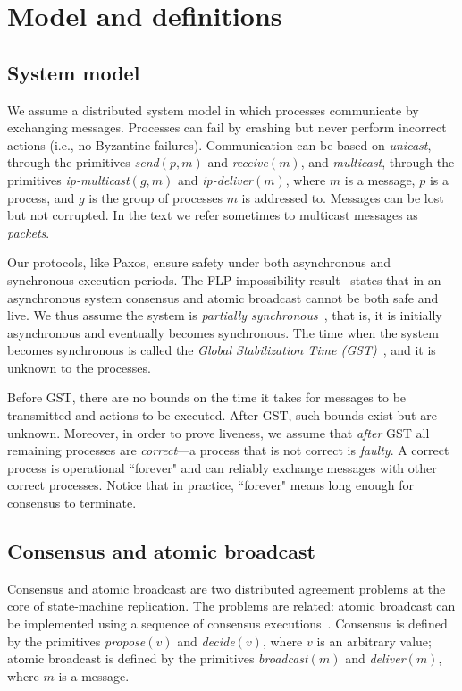\documentclass[final,3p,times,twocolumn,authoryear]{elsarticle}
\begin{document}
\section{Model and definitions}
\label{sec:moddef}

\subsection{System model}
\label{sec:model}

We assume a distributed system model in which processes communicate by exchanging messages. Processes can fail by crashing but never perform incorrect actions (i.e., no Byzantine failures).
Communication can be based on \emph{unicast}, through the primitives \emph{send}$(p,m)$ and \emph{receive}$(m)$, and \emph{multicast}, through the primitives \emph{ip-multicast}$(g,m)$ and \emph{ip-deliver}$(m)$, where $m$ is a message, $p$ is a process, and $g$ is the group of processes $m$ is addressed to. Messages can be lost but not corrupted. In the text we refer sometimes to multicast messages as \emph{packets}.

Our protocols, like Paxos, ensure safety under both asynchronous and synchronous execution periods. The FLP impossibility result~\cite{FLP85} states that in an asynchronous system consensus and atomic broadcast cannot be both safe and live. We thus assume the system is \emph{partially synchronous}~\cite{DLS88}, that is, it is initially asynchronous and eventually becomes synchronous. The time when the system becomes synchronous is called the \emph{Global Stabilization Time (GST)}~\cite{DLS88}, and it is unknown to the processes.

Before GST, there are no bounds on the time it takes for messages to be transmitted and actions to be executed. After GST, such bounds exist but are unknown. Moreover, in order to prove liveness, we assume that \emph{after} GST all remaining processes are \emph{correct}---a process that is not correct is \emph{faulty}. A correct process is operational ``forever" and can reliably exchange messages with other correct processes. Notice that in practice, ``forever" means long enough for consensus to terminate.


\subsection{Consensus and atomic broadcast}

Consensus and atomic broadcast are two distributed agreement problems at the core of state-machine replication. The problems are related: atomic broadcast can be implemented using a sequence of consensus executions~\cite{CT96}. Consensus is defined by the primitives \emph{propose}$(v)$ and \emph{decide}$(v)$, where $v$ is an arbitrary value; atomic broadcast is defined by the primitives \emph{broadcast}$(m)$ and \emph{deliver}$(m)$, where $m$ is a message.
\end{document}
